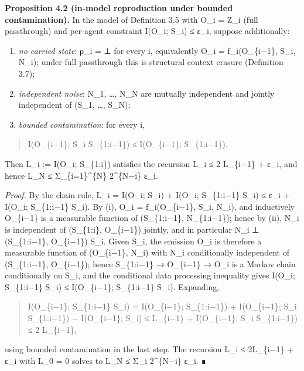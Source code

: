 \documentclass[
  11pt,
]{article}
\begin{document}
\textbf{Proposition 4.2 (in-model reproduction under bounded
contamination).} In the model of Definition 3.5 with O\_i = Z\_i (full
passthrough) and per-agent constraint I(O\_i; S\_i) ≤ ε\_i, suppose
additionally:

\begin{enumerate}
\def\labelenumi{(\roman{enumi})}
\item
  \emph{no carried state}: ρ\_i = ⊥ for every i, equivalently O\_i =
  f\_i(O\_\{i−1\}, S\_i, N\_i); under full passthrough this is
  structural context erasure (Definition 3.7);
\item
  \emph{independent noise}: N\_1, \ldots, N\_N are mutually independent
  and jointly independent of (S\_1, \ldots, S\_N);
\item
  \emph{bounded contamination}: for every i,
\end{enumerate}

\begin{quote}
I(O\_\{i−1\}; S\_i \textbar{} S\_\{1:i−1\}) ≤ I(O\_\{i−1\};
S\_\{1:i−1\}).
\end{quote}

Then L\_i := I(O\_i; S\_\{1:i\}) satisfies the recursion L\_i ≤ 2
L\_\{i−1\} + ε\_i, and hence L\_N ≤ Σ\_\{i=1\}\^{}\{N\} 2\^{}\{N−i\}
ε\_i.

\emph{Proof.} By the chain rule, L\_i = I(O\_i; S\_i) + I(O\_i;
S\_\{1:i−1\} \textbar{} S\_i) ≤ ε\_i + I(O\_i; S\_\{1:i−1\} \textbar{}
S\_i). By (i), O\_i = f\_i(O\_\{i−1\}, S\_i, N\_i), and inductively
O\_\{i−1\} is a measurable function of (S\_\{1:i−1\}, N\_\{1:i−1\});
hence by (ii), N\_i is independent of (S\_\{1:i\}, O\_\{i−1\}) jointly,
and in particular N\_i ⊥ (S\_\{1:i−1\}, O\_\{i−1\}) \textbar{} S\_i.
Given S\_i, the emission O\_i is therefore a measurable function of
(O\_\{i−1\}, N\_i) with N\_i conditionally independent of (S\_\{1:i−1\},
O\_\{i−1\}); hence S\_\{1:i−1\} → O\_\{i−1\} → O\_i is a Markov chain
conditionally on S\_i, and the conditional data processing inequality
gives I(O\_i; S\_\{1:i−1\} \textbar{} S\_i) ≤ I(O\_\{i−1\}; S\_\{1:i−1\}
\textbar{} S\_i). Expanding,

\begin{quote}
I(O\_\{i−1\}; S\_\{1:i−1\} \textbar{} S\_i) = I(O\_\{i−1\};
S\_\{1:i−1\}) + I(O\_\{i−1\}; S\_i \textbar{} S\_\{1:i−1\}) −
I(O\_\{i−1\}; S\_i) ≤ L\_\{i−1\} + I(O\_\{i−1\}; S\_i \textbar{}
S\_\{1:i−1\}) ≤ 2 L\_\{i−1\},
\end{quote}

using bounded contamination in the last step. The recursion L\_i ≤
2L\_\{i−1\} + ε\_i with L\_0 = 0 solves to L\_N ≤ Σ\_i 2\^{}\{N−i\}
ε\_i. ∎
\end{document}
